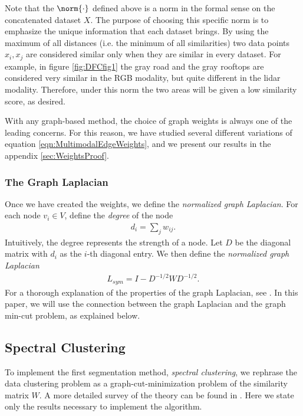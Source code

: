 \documentclass[journal]{IEEEtran}
\begin{document}
Note that the $\norm{\cdot}$ defined above is a norm in the formal sense on the
concatenated dataset $X$. The purpose of choosing this specific norm is to
emphasize the unique information that each dataset brings. By using the maximum
of all distances (i.e. the minimum of all similarities) two data points
$x_i,x_j$ are considered similar only when they are similar in every
dataset. For example, in figure \ref{fig:DFCfig1} the gray road and the gray
rooftops are considered very similar in the RGB modality, but quite different in
the lidar modality. Therefore, under this norm the two areas will be given a low
similarity score, as desired.

With any graph-based method, the choice of graph weights is always one of the leading concerns. For this reason, we have studied several different variations of equation \ref{eqn:MultimodalEdgeWeights}, and we present our results in the appendix \ref{sec:WeightsProof}.

\subsubsection{The Graph Laplacian}\label{sec:GraphLaplacian}

Once we have created the weights, we define the \emph{normalized graph
  Laplacian}.  For each node $v_i\in V$, define the \emph{degree} of the node
\begin{align}
  d_i = \sum_j w_{ij}.
\end{align}
Intuitively, the degree represents the strength of a node. Let $D$ be the
diagonal matrix with $d_i$ as the $i$-th diagonal entry. We then define the
\emph{normalized graph Laplacian}
\begin{align}
  L_{sym} = I - D^{-1/2}WD^{-1/2}.
\end{align}
For a thorough explanation of the properties of the graph Laplacian, see
\cite{Mohar91}. In this paper, we will use the connection between the graph
Laplacian and the graph min-cut problem, as explained below.

\subsection{Spectral Clustering}\label{sec:SpecClust}

To implement the first segmentation method, \emph{spectral clustering}, we
rephrase the data clustering problem as a graph-cut-minimization problem of the
similarity matrix $W$. A more detailed survey of the theory can be found in
\cite{vonLuxburg07}. Here we state only the results necessary to implement the
algorithm.
\end{document}
